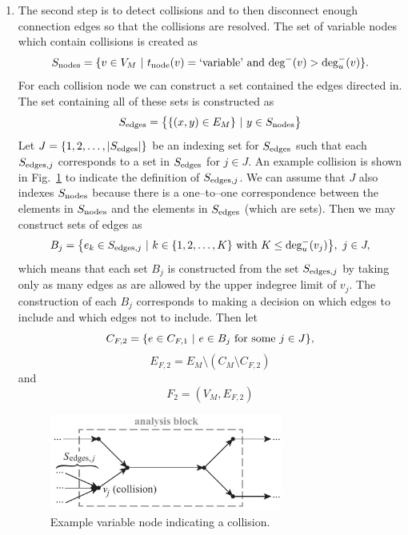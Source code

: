 \begin{enumerate}
	\item The second step is to detect collisions and to then disconnect enough connection edges so that the collisions are resolved. The set of variable nodes which contain collisions is created as
	\begin{equation}
	S_\textrm{nodes} = \{v \in V_M \ | \  t_\textrm{node}(v) = \textrm{`variable'} \textrm{ and } \textrm{deg}^-(v) > \textrm{deg}_u^-(v) \}.
	\end{equation}
	For each collision node we can construct a set contained the edges directed in. The set containing all of these sets is constructed as
	\begin{equation}
	S_\textrm{edges} = \big \{ \{(x,y) \in E_M\} \ | \  y \in S_\textrm{nodes} \big \}
	\end{equation}
	Let $J=\{1,2,\ldots,|S_\textrm{edges}|\}$ be an indexing set for $S_\textrm{edges}$ such that each $S_{\textrm{edges},j}$ corresponds to a set in $S_\textrm{edges}$ for $j \in J$. 
	An example collision is shown in Fig.~\ref{f:collision} to indicate the definition of $S_{\textrm{edges},j}$. 
	We can assume that $J$ also indexes $S_\textrm{nodes}$ because there is a one--to--one correspondence between the elements in $S_\textrm{nodes}$ and the elements in $S_\textrm{edges}$ (which are sets). 
	Then we may construct sets of edges as
	\begin{equation}
	B_j = \big \{e_k \in S_{\textrm{edges},j} \ | \  k \in \{1,2,\ldots,K\} \textrm{ with } K \leq \textrm{deg}_u^-(v_j) \big \}, \ j \in J,
	\end{equation}
	which means that each set $B_j$ is constructed from the set $S_{\textrm{edges},j}$ by taking only as many edges as are allowed by the upper indegree limit of $v_j$. The construction of each $B_j$ corresponds to making a decision on which edges to include and which edges not to include. Then let
	\begin{equation}
	C_{F,2} = \{ e \in C_{F,1} \ | \  e \in B_j \textrm{ for some } j \in J\},
	\end{equation}
	\begin{equation}
	E_{F,2} = E_M \setminus (C_M \setminus C_{F,2})
	\end{equation}
	and
	\begin{equation}
	F_2 = (V_M,E_{F,2})
	\end{equation}
	\begin{figure}[htb!]
		\begin{center}
		\includegraphics[width=3in]{images/analysis_block_collision}
		\end{center}
		\vspace{-20pt}
	\caption{Example variable node indicating a collision.}
	\label{f:collision}
	\end{figure}


\end{enumerate}
